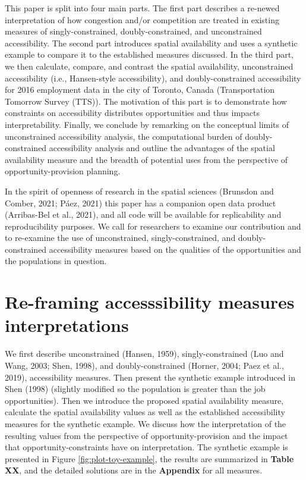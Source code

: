 \documentclass[]{elsarticle} %
\begin{document}
This paper is split into four main parts. The first part describes a
re-newed interpretation of how congestion and/or competition are treated
in existing measures of singly-constrained, doubly-constrained, and
unconstrained accessibility. The second part introduces spatial
availability and uses a synthetic example to compare it to the
established measures discussed. In the third part, we then calculate,
compare, and contrast the spatial availability, unconstrained
accessibility (i.e., Hansen-style accessibility), and doubly-constrained
accessibility for 2016 employment data in the city of Toronto, Canada
(Transportation Tomorrow Survey (TTS)). The motivation of this part is
to demonstrate how constraints on accessibility distributes
opportunities and thus impacts interpretability. Finally, we conclude by
remarking on the conceptual limits of unconstrained accessibility
analysis, the computational burden of doubly-constrained accessibility
analysis and outline the advantages of the spatial availability measure
and the breadth of potential uses from the perspective of
opportunity-provision planning.

In the spirit of openness of research in the spatial sciences (Brunsdon
and Comber, 2021; Páez, 2021) this paper has a companion open data
product (Arribas-Bel et al., 2021), and all code will be available for
replicability and reproducibility purposes. We call for researchers to
examine our contribution and to re-examine the use of unconstrained,
singly-constrained, and doubly- constrained accessibility measures based
on the qualities of the opportunities and the populations in question.

\hypertarget{background}{%
\section{Re-framing accesssibility measures
interpretations}\label{background}}

We first describe unconstrained (Hansen, 1959), singly-constrained (Luo
and Wang, 2003; Shen, 1998), and doubly-constrained (Horner, 2004; Paez
et al., 2019), accessibility measures. Then present the synthetic
example introduced in Shen (1998) (slightly modified so the population
is greater than the job opportunities). Then we introduce the proposed
spatial availability measure, calculate the spatial availability values
as well as the established accessibility measures for the synthetic
example. We discuss how the interpretation of the resulting values from
the perspective of opportunity-provision and the impact that
opportunity-constraints have on interpretation. The synthetic example is
presented in Figure \ref{fig:plot-toy-example}, the results are
summarized in \textbf{Table XX}, and the detailed solutions are in the
\textbf{Appendix} for all measures.
\end{document}
